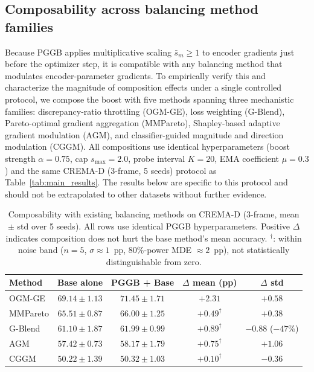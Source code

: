\documentclass{article}
\begin{document}
\subsection{Composability across balancing method families}
\label{app:composability}

Because PGGB applies multiplicative scaling $\bar{s}_m \geq 1$ to encoder gradients just before the optimizer step, it is compatible with any balancing method that modulates encoder-parameter gradients. To empirically verify this and characterize the magnitude of composition effects under a single controlled protocol, we compose the boost with five methods spanning three mechanistic families: discrepancy-ratio throttling (OGM-GE), loss weighting (G-Blend), Pareto-optimal gradient aggregation (MMPareto), Shapley-based adaptive gradient modulation (AGM), and classifier-guided magnitude and direction modulation (CGGM). All compositions use identical hyperparameters (boost strength $\alpha=0.75$, cap $s_{\max}=2.0$, probe interval $K=20$, EMA coefficient $\mu=0.3$) and the same CREMA-D (3-frame, 5 seeds) protocol as Table~\ref{tab:main_results}. The results below are specific to this protocol and should not be extrapolated to other datasets without further evidence.

\begin{table}[H]
\centering
\caption{Composability with existing balancing methods on CREMA-D (3-frame, mean $\pm$ std over 5 seeds). All rows use identical PGGB hyperparameters. Positive $\Delta$ indicates composition does not hurt the base method's mean accuracy. $^\dagger$: within noise band ($n{=}5$, $\sigma \approx 1$~pp, 80\%-power MDE $\approx 2$~pp), not statistically distinguishable from zero.}
\label{tab:composability}
\begin{tabular}{lcccc}
\toprule
\textbf{Method} & \textbf{Base alone} & \textbf{PGGB + Base} & \textbf{$\Delta$ mean (pp)} & \textbf{$\Delta$ std} \\
\midrule
OGM-GE   & $69.14 \pm 1.13$ & $71.45 \pm 1.71$ & $\mathbf{+2.31}$ & $+0.58$ \\
MMPareto & $65.51 \pm 0.87$ & $66.00 \pm 1.25$ & $+0.49^\dagger$ & $+0.38$ \\
G-Blend  & $61.10 \pm 1.87$ & $61.99 \pm 0.99$ & $+0.89^\dagger$ & $\mathbf{-0.88}$ ($-47\%$) \\
AGM      & $57.42 \pm 0.73$ & $58.17 \pm 1.79$ & $+0.75^\dagger$ & $+1.06$ \\
CGGM     & $50.22 \pm 1.39$ & $50.32 \pm 1.03$ & $+0.10^\dagger$ & $-0.36$ \\
\bottomrule
\end{tabular}
\end{table}
\end{document}
